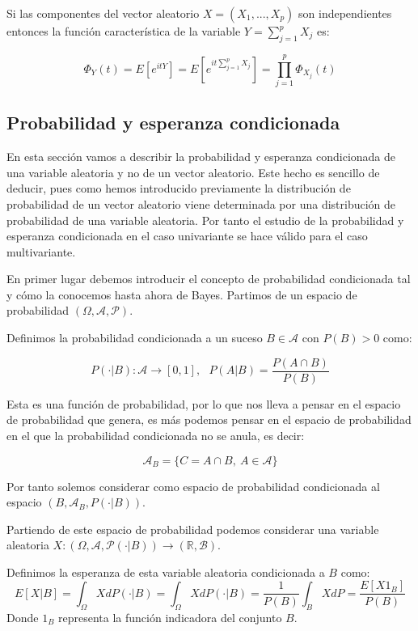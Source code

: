 \begin{proposicion}
	Si las componentes del vector aleatorio $X = (X_1 , ... , X_p)$ son independientes entonces la función característica de la variable $Y = \sum_{j=1}^{p}X_j$ es:
	
	$$\Phi_Y (t) = E[e^{itY}] = E[e^{it \sum_{j=1}^{p}X_j}] = \prod_{j=1}^{p}\Phi_{X_j} (t)$$
\end{proposicion}

\subsection{Probabilidad y esperanza condicionada}

En esta sección vamos a describir la probabilidad y esperanza condicionada de una variable aleatoria y no de un vector aleatorio. Este hecho es sencillo de deducir, pues como hemos introducido previamente la distribución de probabilidad de un vector aleatorio viene determinada por una distribución de probabilidad de una variable aleatoria. Por tanto el estudio de la probabilidad y esperanza condicionada en el caso univariante se hace válido para el caso multivariante. 

En primer lugar debemos introducir el concepto de probabilidad condicionada tal y cómo la conocemos hasta ahora de Bayes. Partimos de un espacio de probabilidad $(\Omega , \mathcal{A}, \mathcal{P})$.

\begin{definicion}
	Definimos la probabilidad condicionada a un suceso $B\in \mathcal{A}$ con $P(B)>0$ como:
	
	$$P(\cdot | B) : \mathcal{A} \rightarrow [0,1] , \ \ \ P(A | B) = \frac{P(A\cap B)}{P(B)}$$
\end{definicion}

Esta es una función de probabilidad, por lo que nos lleva a pensar en el espacio de probabilidad que genera, es más podemos pensar en el espacio de probabilidad en el que la probabilidad condicionada no se anula, es decir:

$$\mathcal{A}_B = \{ C = A\cap B, \ A\in \mathcal{A} \}$$

Por tanto solemos considerar como espacio de probabilidad condicionada al espacio $(B, \mathcal{A}_B , P(\cdot | B))$.

Partiendo de este espacio de probabilidad podemos considerar una variable aleatoria $X : (\Omega , \mathcal{A}, \mathcal{P}(\cdot | B)) \rightarrow (\mathbb{R}, \mathcal{B})$. 

\begin{definicion}
	Definimos la esperanza de esta variable aleatoria condicionada a $B$ como:
	$$E[X | B] = \int_{\Omega}XdP(\cdot | B) = \int_{\Omega}XdP(\cdot | B) = \frac{1}{P(B)}\int_{B}XdP = \frac{E[X1_B]}{P(B)}$$
	Donde $1_B$ representa la función indicadora del conjunto $B$.
\end{definicion}

